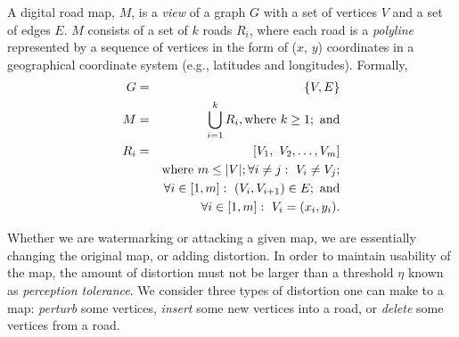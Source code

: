 %
%
A digital road map, $M$, is a {\em view} of a graph $G$
with a set of vertices $V$ and a set of edges $E$.
$M$ consists of a set of $k$ roads $R_i$, where each road 
is a {\em polyline} represented by a sequence of vertices in 
the form of ($x$, $y$) coordinates in a geographical coordinate system 
(e.g., latitudes and longitudes). 
Formally,  
\begin{eqnarray*} \label{map}
G &=& \left\{V,E\right\}\\
M &=& \bigcup _{i=1}^{k}{ {R}_{i} }, {\rm where}~ k \ge 1;~ \rm{and}  \\ 
{R}_{i} &=& [ V_1,~ V_2, \ldots, V_m ]\\
&& {\rm where}~ m \le |V|; \forall i \neq j:~ V_i \neq V_j; \\ 
&& \forall i \in [1, m]:~ (V_i, V_{i+1})\in E;~  \rm{and} \\ 
&& \forall i \in [1, m]:~ V_i = (x_i, y_i).
\end{eqnarray*}
%



Whether we are watermarking or attacking a given map, we are essentially
changing the original map, or adding distortion. 
In order to maintain usability of the map, the amount of distortion
must not be larger than a threshold $\eta$ known as {\em perception tolerance}.
We consider three types of distortion one can make to a map: 
{\em perturb} some vertices, {\em insert} some new vertices into a road, or
{\em delete} some vertices from a road. 

